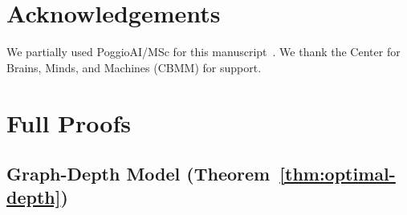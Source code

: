 \documentclass[twoside,11pt]{article}
\begin{document}
\section*{Acknowledgements}

We partially used PoggioAI/MSc for this manuscript~\citep{PoggioAIMSc_2026}.
We thank the Center for Brains, Minds, and Machines (CBMM) for support.

\appendix
\section{Full Proofs}
\label{app:proofs}

\subsection{Graph-Depth Model (Theorem~\ref{thm:optimal-depth})}
\label{app:graph-depth}
\end{document}
